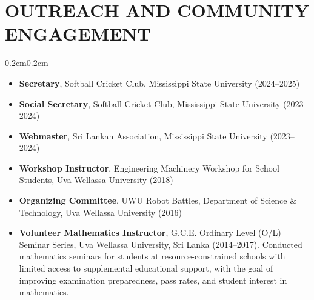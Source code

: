 \documentclass[10pt, letterpaper]{article}
\newenvironment{highlights}{%
    \begin{itemize}[topsep=0.08cm, parsep=0.08cm, partopsep=0pt,
                    itemsep=0pt, leftmargin=0.4cm + 10pt]
}{\end{itemize}}
\newenvironment{onecolentry}{%
    \begin{adjustwidth}{0.2cm}{0.2cm}
}{\end{adjustwidth}}
\begin{document}
\section{OUTREACH AND COMMUNITY ENGAGEMENT}
\vspace{0.08cm}
\begin{onecolentry}
    \begin{highlights}
        \item \textbf{Secretary}, Softball Cricket Club, Mississippi State University
              (2024--2025)
        \item \textbf{Social Secretary}, Softball Cricket Club, Mississippi State
              University (2023--2024)
        \item \textbf{Webmaster}, Sri Lankan Association, Mississippi State University
              (2023--2024)
        \item \textbf{Workshop Instructor}, Engineering Machinery Workshop for School
              Students, Uva Wellassa University (2018)
        \item \textbf{Organizing Committee}, UWU Robot Battles, Department of Science
              \& Technology, Uva Wellassa University (2016)
        \item \textbf{Volunteer Mathematics Instructor}, G.C.E. Ordinary Level (O/L)
              Seminar Series, Uva Wellassa University, Sri Lanka (2014--2017).
              Conducted mathematics seminars for students at resource-constrained
              schools with limited access to supplemental educational support, with
              the goal of improving examination preparedness, pass rates, and student
              interest in mathematics.
    \end{highlights}
\end{onecolentry}
\vspace{0.10cm}

\end{document}
